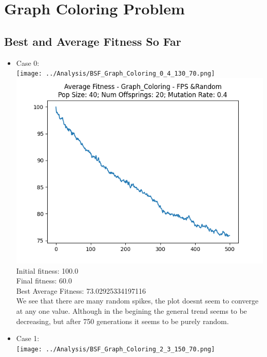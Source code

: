 \documentclass[12pt]{report} %
\begin{document}
\newpage





\section{Graph Coloring Problem}

\subsection{Best and Average Fitness So Far}


\begin{itemize}

	\item Case 0:\\
	      \texttt{[image: ../Analysis/BSF\_Graph\_Coloring\_0\_4\_130\_70.png]}
	      \includegraphics[scale=0.5]{../Analysis/ASF_Graph_Coloring_0_4_40_20.png}
	      \\Initial fitness:  100.0
	      \\Final fitness:  60.0
	      \\Best Average Fitness: 73.02925334197116
	      \\We see that there are many random spikes, the plot doesnt seem to converge at any one value. Although in the begining the general trend seems to be decreasing, but after 750 generations it seems to be purely random.
	      \\
	\item Case 1:\\
	      \texttt{[image: ../Analysis/BSF\_Graph\_Coloring\_2\_3\_150\_70.png]}

\end{itemize}
\end{document}
